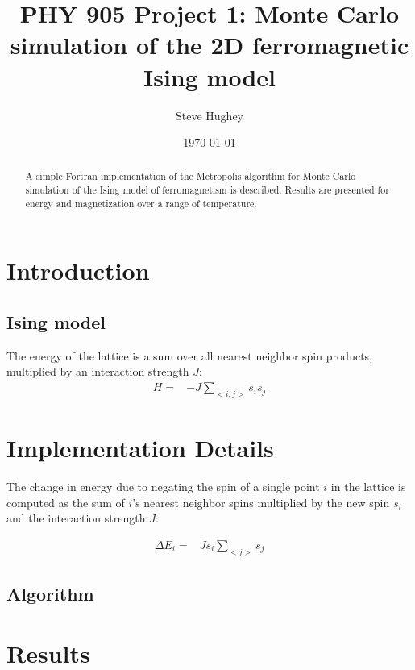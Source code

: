 \documentclass[]{article}
\begin{document}
 

\title{PHY 905 Project 1: Monte Carlo simulation of the 2D ferromagnetic Ising model}

\author{Steve Hughey}

\date{\today}

\maketitle

\begin{abstract}
A simple Fortran implementation of the Metropolis algorithm for Monte Carlo simulation of the Ising model of ferromagnetism is described. Results are presented for energy and magnetization over a range of temperature.
\end{abstract}

\section{\label{sec:intro}Introduction}

\subsection{\label{sec:ising}Ising model}

The energy of the lattice is a sum over all nearest neighbor spin products, multiplied by an interaction strength $J$:
\begin{align}
H =& -J \sum_{<i,j>} s_i s_j
\end{align}

\section{\label{sec:imp}Implementation Details}

The change in energy due to negating the spin of a single point $i$ in the lattice is computed as the sum of $i$'s nearest neighbor spins multiplied by the new spin $s_i$ and the interaction strength $J$:

\begin{align}
\Delta E_i =& J s_i \sum_{<j>} s_j
\end{align}

\subsection{\label{sec:alg}Algorithm}

\section{\label{sec:res}Results}
\end{document}
